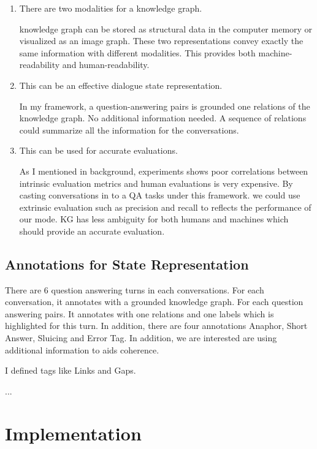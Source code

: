 \documentclass[bsc,frontabs,twoside,singlespacing,parskip,deptreport]{infthesis}     %
\begin{document}
\begin{enumerate}
   \item There are two modalities for a knowledge graph. 
   
   
   knowledge graph can be stored as structural data in the computer memory or visualized as an image graph. These two representations convey exactly the same information with different modalities. This provides both machine-readability and human-readability.
 
   \item This can be an effective dialogue state representation.
   
 
    In my framework, a question-answering pairs is grounded one relations of the knowledge graph. No additional information needed. A sequence of relations could summarize all the information for the conversations.
    
    
    \item This can be used for accurate evaluations.
       
      
    As I mentioned in background, experiments shows poor correlations between intrinsic evaluation metrics and human evaluations is very expensive. By casting conversations in to a QA tasks under this framework. we could use extrinsic evaluation such as precision and recall to reflects the performance of our mode. KG has less ambiguity for both humans and machines which should provide an accurate evaluation.
\end{enumerate}


\subsection{Annotations for State Representation}


There are 6 question answering turns in each conversations. For each conversation, it annotates with a grounded knowledge graph. For each question answering pairs. It annotates with one relations and one labels which is highlighted for this turn. In addition, there are four annotations Anaphor, Short Answer, Sluicing and Error Tag. In addition, we are interested are using additional information to aids coherence.

I defined tags like Links and Gaps.

...

\section{Implementation}
\end{document}

